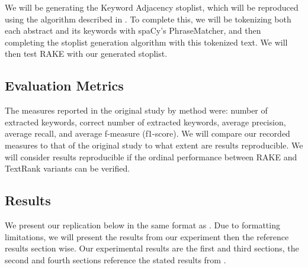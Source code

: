 \documentclass[11pt,a4paper]{article}
\begin{document}
We will be generating the Keyword Adjacency stoplist, which will be reproduced using the algorithm described in \citet{hulth-2003-improved}. To complete this, we will be tokenizing both each abstract and its keywords with spaCy's PhraseMatcher, and then completing the stoplist generation algorithm with this tokenized text. We will then test RAKE with our generated stoplist.

\subsection{Evaluation Metrics}

The measures reported in the original study by method were: number of extracted keywords, correct number of extracted keywords, average precision, average recall, and average f-measure (f1-score).  We will compare our recorded measures to that of the original study to what extent are  results reproducible. We will consider  results reproducible if the ordinal performance between RAKE and TextRank variants can be verified. 

\subsection{Results}

We present our replication below in the same format as \citet{1}. Due to formatting limitations, we will present the results from our experiment then the reference results section wise. Our experimental results are the first and third sections, the second and fourth sections reference the stated results from \citep{1}.
\end{document}
